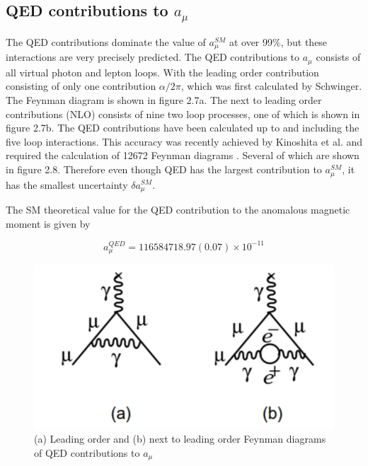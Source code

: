 \subsection{QED contributions to $a_{\mu}$}

The QED contributions dominate the value of $a_{\mu}^{SM}$ at over 99$\%$, but these interactions are very precisely predicted. 
The QED contributions to $a_{\mu}$ consists of all virtual photon and lepton \cite{Reference15} loops. With the leading order contribution consisting of only one contribution ${\alpha}/2{\pi}$, which was first calculated by Schwinger. The Feynman diagram is shown in figure 2.7a. The next to leading order contributions (NLO) consists of nine two loop processes, one of which is shown in figure 2.7b. The QED contributions have been calculated up to and including the five loop interactions. This accuracy was recently achieved by Kinoshita et al. and required the calculation of 12672 Feynman diagrams \cite{Reference16}\cite{Reference17}. Several of which are shown in figure 2.8. Therefore even though QED has the largest contribution to $a_{\mu}^{SM}$, it has the smallest uncertainty ${\delta}a_{\mu}^{SM}$.

The SM theoretical value for the QED contribution to the anomalous magnetic moment is given by

\begin{equation}
a_{\mu}^{QED} = 116 584 718.97(0.07){\times}10^{-11}
\end{equation}

\begin{figure}[th]
\centering
\includegraphics[scale=0.6]{Figures/QED_LO_NLO}
\decoRule
\caption{(a) Leading order and (b) next to leading order Feynman diagrams of QED contributions to $a_{\mu}$}
\label{fig:QED_NO_NLO}
\end{figure}

